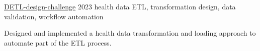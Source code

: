 \begin{cventries}

\cvshortentry
  {\href{https://github.com/bubnicbf/DETL-design-challenge}{DETL-design-challenge}}
  {2023}
  {health data ETL, transformation design, data validation, workflow automation}
    \begin{flushleft} %
      Designed and implemented a health data transformation and loading approach to automate part of the ETL process.
    \end{flushleft}



\end{cventries}

